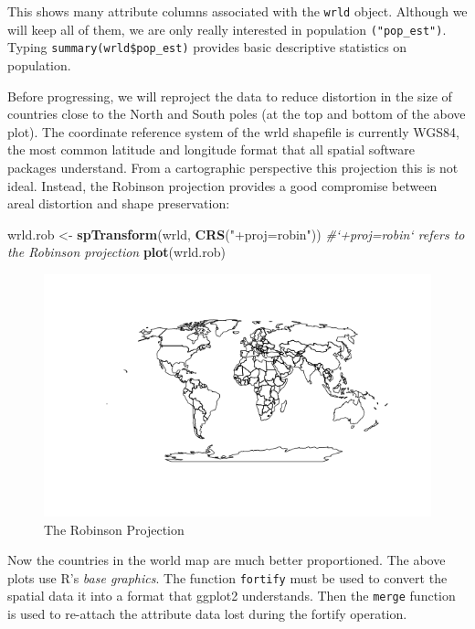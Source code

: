 \documentclass[]{article}
\newenvironment{Shaded}{}{}
\newcommand{\KeywordTok}[1]{\textcolor[rgb]{0.00,0.44,0.13}{\textbf{{#1}}}}
\newcommand{\StringTok}[1]{\textcolor[rgb]{0.25,0.44,0.63}{{#1}}}
\newcommand{\CommentTok}[1]{\textcolor[rgb]{0.38,0.63,0.69}{\textit{{#1}}}}
\newcommand{\NormalTok}[1]{{#1}}
\begin{document}
This shows many attribute columns associated with the \texttt{wrld}
object. Although we will keep all of them, we are only really interested
in population \texttt{("pop\_est")}. Typing
\texttt{summary(wrld\$pop\_est)} provides basic descriptive statistics
on population.

Before progressing, we will reproject the data to reduce distortion in
the size of countries close to the North and South poles (at the top and
bottom of the above plot). The coordinate reference system of the wrld
shapefile is currently WGS84, the most common latitude and longitude
format that all spatial software packages understand. From a
cartographic perspective this projection this is not ideal. Instead, the
Robinson projection provides a good compromise between areal distortion
and shape preservation:

\begin{Shaded}
\begin{Highlighting}[]
\NormalTok{wrld.rob <-}\StringTok{ }\KeywordTok{spTransform}\NormalTok{(wrld, }\KeywordTok{CRS}\NormalTok{(}\StringTok{"+proj=robin"}\NormalTok{))  }\CommentTok{#`+proj=robin` refers to the Robinson projection}
\KeywordTok{plot}\NormalTok{(wrld.rob)}
\end{Highlighting}
\end{Shaded}

\begin{figure}[htbp]
\centering
\includegraphics{figure/The_Robinson_Projection.png}
\caption{The Robinson Projection}
\end{figure}

Now the countries in the world map are much better proportioned. The
above plots use R's \emph{base graphics}. The function \texttt{fortify}
must be used to convert the spatial data it into a format that ggplot2
understands. Then the \texttt{merge} function is used to re-attach the
attribute data lost during the fortify operation.
\end{document}
